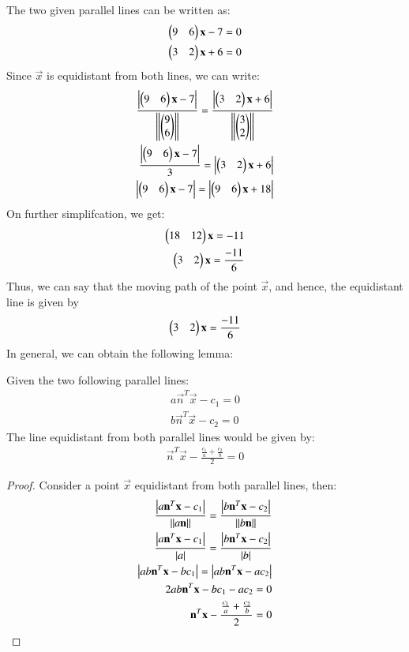 \documentclass[journal,12pt,twocolumn]{IEEEtran}
\begin{document}
The two given parallel lines can be written as:
\begin{align}
    \begin{pmatrix}9 & 6\end{pmatrix}\mathbf{x} - 7 = 0\\
    \begin{pmatrix}3 & 2\end{pmatrix}\mathbf{x} + 6 = 0
\end{align}
Since $\vec{x}$ is equidistant from both lines, we can write:
\begin{align}
    \frac{\left\vert\begin{pmatrix}9 & 6\end{pmatrix}\mathbf{x} - 7\right\vert}{\left\lVert\begin{pmatrix}9\\6\end{pmatrix}\right\rVert} = \frac{\left\vert\begin{pmatrix}3 & 2\end{pmatrix}\mathbf{x} + 6\right\vert}{\left\lVert\begin{pmatrix}3\\2\end{pmatrix}\right\rVert}\\
    \frac{\left\vert\begin{pmatrix}9 & 6\end{pmatrix}\mathbf{x} - 7\right\vert}{3} = \left\vert\begin{pmatrix}3 & 2\end{pmatrix}\mathbf{x} + 6\right\vert\\
   \left\vert\begin{pmatrix}9 & 6\end{pmatrix}\mathbf{x} - 7\right\vert = \left\vert\begin{pmatrix}9 & 6\end{pmatrix}\mathbf{x} + 18\right\vert
\end{align}
On further simplifcation, we get:
\begin{align}
      \begin{pmatrix}18 & 12\end{pmatrix}\mathbf{x} = -11\\
   \begin{pmatrix}3 & 2\end{pmatrix}\mathbf{x} = \frac{-11}{6}
\end{align}
Thus, we can say that the moving path of the point $\vec{x}$, and hence, the equidistant line is given by 
\begin{align}
    \begin{pmatrix}3 & 2\end{pmatrix}\mathbf{x} = \frac{-11}{6}
\end{align}
In general, we can obtain the following lemma:
\begin{lemma}
Given the two following parallel lines:
\begin{align}
    a\vec{n}^T\vec{x} - c_1 = 0\\
    b\vec{n}^T\vec{x} - c_2 = 0
\end{align}
The line equidistant from both parallel lines would be given by:
\begin{align}
    \vec{n}^T\vec{x} - \frac{\frac{c_1}{a} + \frac{c_2}{b}}{2} = 0
\end{align}
\end{lemma}
\begin{proof}
Consider a point $\vec{x}$ equidistant from both parallel lines, then:
\begin{align}
    \frac{\left\vert a\mathbf{n}^T\mathbf{x} - c_1\right\vert}{\left\lVert a\mathbf{n}\right\rVert} = 
    \frac{\left\vert b\mathbf{n}^T\mathbf{x} - c_2\right\vert}{\left\lVert b\mathbf{n}\right\rVert}\\
      \frac{\left\vert a\mathbf{n}^T\mathbf{x} - c_1\right\vert}{\left\vert a\right\vert} = 
    \frac{\left\vert b\mathbf{n}^T\mathbf{x} - c_2\right\vert}{\left\vert b\right\vert}\\
      \left\vert ab\mathbf{n}^T\mathbf{x} - bc_1\right\vert = \left\vert ab\mathbf{n}^T\mathbf{x} - ac_2\right\vert\\
      2ab\mathbf{n}^T\mathbf{x} - bc_1 - ac_2 = 0\\
       \mathbf{n}^T\mathbf{x} - \frac{\frac{c_1}{a} + \frac{c_2}{b}}{2} = 0
\end{align}
\end{proof}
\end{document}
